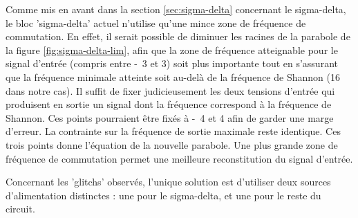 Comme mis en avant dans la section \ref{sec:sigma-delta} concernant le
sigma-delta, le bloc 'sigma-delta' actuel n'utilise qu'une mince zone
de fréquence de commutation. En effet, il serait possible de diminuer
les racines de la parabole de la figure \ref{fig:sigma-delta-lim}, 
afin que la zone de fréquence atteignable pour le signal d'entrée 
(compris entre \unit{-3}{\volt} et \unit{3}{\volt})
soit plus importante tout en s'assurant que la fréquence minimale
atteinte soit au-delà de la fréquence de Shannon (\unit{16}{\kilo\hertz} dans
notre cas). Il suffit de fixer judicieusement les deux tensions d'entrée qui produisent
en sortie un signal dont la fréquence correspond à la fréquence de Shannon. 
Ces points pourraient être fixés à \unit{-4}{\volt} et \unit{4}{\volt}
afin de garder une marge d'erreur. La contrainte sur la fréquence
de sortie maximale reste identique.
Ces trois points donne l'équation de la nouvelle parabole. Une plus 
grande zone de fréquence de commutation permet une meilleure reconstitution
du signal d'entrée.

Concernant les 'glitchs' observés, l'unique solution est d'utiliser deux 
sources d'alimentation distinctes : une pour le sigma-delta, et une pour le reste du circuit.